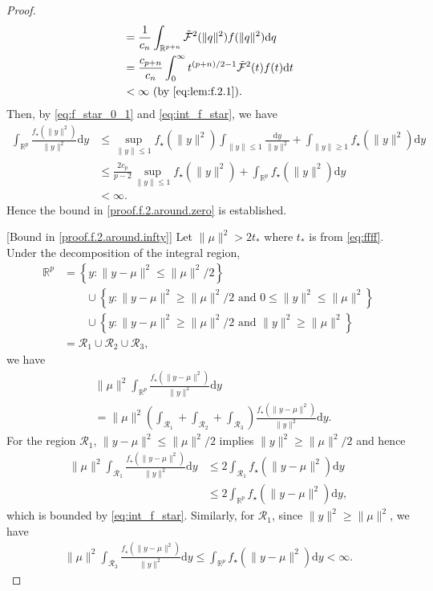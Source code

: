 \documentclass[preprint,11pt]{imsart}
\numberwithin{equation}{section}
\theoremstyle{plain}
\theoremstyle{definition}
\theoremstyle{remark}
\newcommand{\rd}{\mathrm{d}}
\begin{document}
\begin{proof}
\begin{equation}
\begin{split}
 &=\frac{1}{c_n}\int_{\mathbb{R}^{p+n}}\tilde{\mathcal{F}}^2(\|q\|^2)f(\|q\|^2)\rd q \\
   &=\frac{c_{p+n}}{c_n}\int_0^\infty t^{(p+n)/2-1}\tilde{\mathcal{F}}^2(t)f(t)\rd t \\
   &<\infty \ (\text{by \eqref{eq:lem:f.2.1}}).
  \end{split}
\end{equation}  
 Then, by \eqref{eq:f_star_0_1} and \eqref{eq:int_f_star}, we have
      \begin{align*}
       \int_{\mathbb{R}^p}\frac{f_\star(\|y\|^2)}{\|y\|^2}\rd y 
&       \leq \sup_{\|y\|\leq 1}f_\star(\|y\|^2) \int_{\|y\|\leq 1}\frac{\rd y}{\|y\|^2}
+\int_{\|y\|\geq 1}f_\star(\|y\|^2)\rd y \\
&\leq \frac{2c_p }{p-2}\sup_{\|y\|\leq 1}f_\star(\|y\|^2)+
       \int_{\mathbb{R}^p}f_\star(\|y\|^2)\rd y \\
       &<\infty.
      \end{align*}
 Hence the bound in \eqref{proof.f.2.around.zero} is established.
 
 [Bound in \eqref{proof.f.2.around.infty}] Let $ \|\mu\|^2>2t_*$
where $t_*$ is from \eqref{eq:ffff}.
Under the decomposition  of the integral region,
\begin{align*}
 \mathbb{R}^p
 &= \left\{y:\|y-\mu\|^2\leq \|\mu\|^2/2\right\} \\ &\qquad \cup
 \left\{y:\|y-\mu\|^2\geq \|\mu\|^2/2\text{ and }0\leq \|y\|^2\leq \|\mu\|^2\right\}
 \\ &\qquad \cup
 \left\{y:\|y-\mu\|^2\geq \|\mu\|^2/2\text{ and } \|y\|^2\geq \|\mu\|^2\right\} \\
&=\mathcal{R}_1\cup\mathcal{R}_2\cup\mathcal{R}_3,
\end{align*}
 we have
\begin{align*}
&\|\mu\|^2 \int_{\mathbb{R}^p}\frac{f_\star(\|y-\mu\|^2)}{\|y\|^2}\rd y  \\
 &= \|\mu\|^2 \left(\int_{\mathcal{R}_1}+\int_{\mathcal{R}_2}+\int_{\mathcal{R}_3}\right)
 \frac{f_\star(\|y-\mu\|^2)}{\|y\|^2}\rd y .
\end{align*}
For the region $\mathcal{R}_1$, $\|y-\mu\|^2\leq \|\mu\|^2/2$ implies $\|y\|^2\geq \|\mu\|^2/2$
 and hence
\begin{align*}
 \|\mu\|^2 \int_{\mathcal{R}_1}\frac{f_\star(\|y-\mu\|^2)}{\|y\|^2}\rd y
&\leq 2\int_{\mathcal{R}_1}f_\star(\|y-\mu\|^2)\rd y \\
&\leq 2\int_{\mathbb{R}^p}f_\star(\|y-\mu\|^2)\rd y, 
\end{align*}
which is bounded by \eqref{eq:int_f_star}. 
 Similarly, for $\mathcal{R}_1$, since $\|y\|^2\geq \|\mu\|^2$, we have
 \begin{align*}
   \|\mu\|^2 \int_{\mathcal{R}_3}\frac{f_\star(\|y-\mu\|^2)}{\|y\|^2}\rd y
\leq \int_{\mathbb{R}^p}f_\star(\|y-\mu\|^2)\rd y  <\infty.
 \end{align*}


\end{proof}
\end{document}
